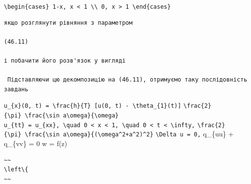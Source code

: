 \documentclass[
  ukrainian,
]{article}
\begin{document}
\texttt{\textbackslash{}begin\{cases\}\ 1-\textbar{}x\textbar{},\ \textbar{}x\textbar{}\ \textless{}\ 1\ \textbackslash{}\textbackslash{}\ 0,\ \textbar{}x\textbar{}\ \textgreater{}\ 1\ \textbackslash{}end\{cases\}}

\begin{verbatim}
якщо розглянути рівняння з параметром

(46.11)

і побачити його розв'язок у вигляді

 Підставляючи цю декомпозицію на (46.11), отримуємо таку послідовність завдань
\end{verbatim}

\texttt{u\_\{x\}(0,\ t)\ =\ \textbackslash{}frac\{h\}\{T\}\ {[}u(0,\ t)\ -\ \textbackslash{}theta\_\{1\}(t){]}}
\texttt{\textbackslash{}frac\{2\}\{\textbackslash{}pi\}\ \textbackslash{}frac\{\textbackslash{}sin\ a\textbackslash{}omega\}\{\textbackslash{}omega\}}
\texttt{u\_\{tt\}\ =\ u\_\{xx\},\ \textbackslash{}quad\ 0\ \textless{}\ x\ \textless{}\ 1,\ \textbackslash{}quad\ 0\ \textless{}\ t\ \textless{}\ \textbackslash{}infty,}
\texttt{\textbackslash{}frac\{2\}\{\textbackslash{}pi\}\ \textbackslash{}frac\{\textbackslash{}sin\ a\textbackslash{}omega\}\{(\textbackslash{}omega\^{}2+a\^{}2)\^{}2\}}
\texttt{\textbackslash{}Delta\ u\ =\ 0,} q\_\{uu\} + q\_\{vv\} = 0 w =
f(z)

\begin{verbatim}
~~
\left\{
~~
\end{verbatim}
\end{document}
